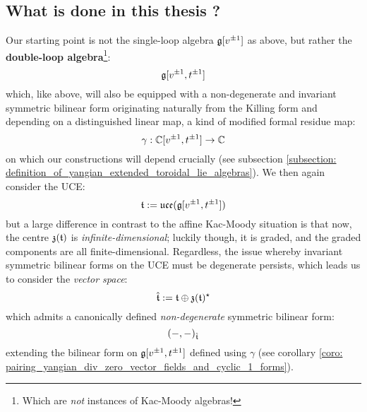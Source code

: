     \subsection{What is done in this thesis ?}
        Our starting point is not the single-loop algebra $\mathfrak{g}[v^{\pm 1}]$ as above, but rather the \textbf{double-loop algebra}\footnote{Which are \textit{not} instances of Kac-Moody algebras!}:
            $$\mathfrak{g}[v^{\pm 1}, t^{\pm 1}]$$
        which, like above, will also be equipped with a non-degenerate and invariant symmetric bilinear form originating naturally from the Killing form and depending on a distinguished linear map, a kind of modified formal residue map:
            $$\gamma: \mathbb{C}[v^{\pm 1}, t^{\pm 1}] \to \mathbb{C}$$
        on which our constructions will depend crucially (see subsection \ref{subsection: definition_of_yangian_extended_toroidal_lie_algebras}). We then again consider the UCE:
            $$\mathfrak{t} := \mathfrak{uce}(\mathfrak{g}[v^{\pm 1}, t^{\pm 1}])$$
        but a large difference in contrast to the affine Kac-Moody situation is that now, the centre $\mathfrak{z}(\mathfrak{t})$ is \textit{infinite-dimensional}; luckily though, it is graded, and the graded components are all finite-dimensional. Regardless, the issue whereby invariant symmetric bilinear forms on the UCE must be degenerate persists, which leads us to consider the \textit{vector space}:
            $$\hat{\mathfrak{t}} := \mathfrak{t} \oplus \mathfrak{z}(\mathfrak{t})^{\star}$$
        which admits a canonically defined \textit{non-degenerate} symmetric bilinear form:
            $$(-, -)_{\hat{\mathfrak{t}}}$$
        extending the bilinear form on $\mathfrak{g}[v^{\pm 1}, t^{\pm 1}]$ defined using $\gamma$ (see corollary \ref{coro: pairing_yangian_div_zero_vector_fields_and_cyclic_1_forms}).
            
